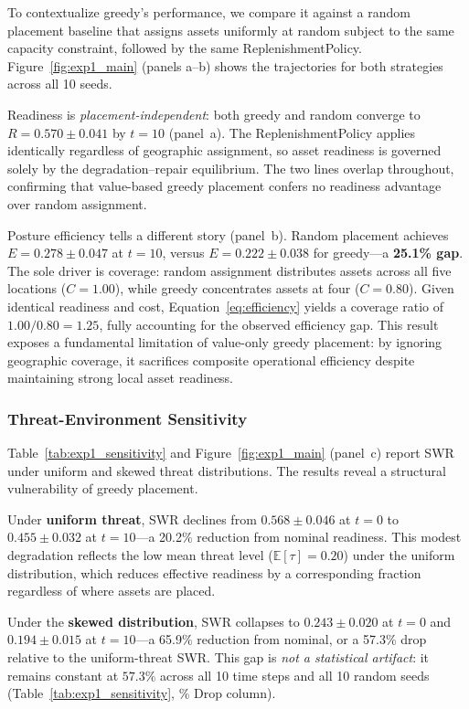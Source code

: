 \documentclass[11pt]{article}
\begin{document}
To contextualize greedy's performance, we compare it against a random
placement baseline that assigns assets uniformly at random subject to the
same capacity constraint, followed by the same ReplenishmentPolicy.
Figure~\ref{fig:exp1_main} (panels a--b) shows the trajectories for both
strategies across all 10 seeds.

Readiness is \emph{placement-independent}: both greedy and random converge
to $R = 0.570 \pm 0.041$ by $t = 10$ (panel~a). The ReplenishmentPolicy
applies identically regardless of geographic assignment, so asset readiness
is governed solely by the degradation--repair equilibrium. The two lines
overlap throughout, confirming that value-based greedy placement confers
no readiness advantage over random assignment.

Posture efficiency tells a different story (panel~b). Random placement
achieves $E = 0.278 \pm 0.047$ at $t = 10$, versus $E = 0.222 \pm 0.038$
for greedy---a \textbf{25.1\% gap}. The sole driver is coverage: random
assignment distributes assets across all five locations ($C = 1.00$),
while greedy concentrates assets at four ($C = 0.80$). Given identical
readiness and cost, Equation~\eqref{eq:efficiency} yields a coverage
ratio of $1.00 / 0.80 = 1.25$, fully accounting for the observed
efficiency gap. This result exposes a fundamental limitation of value-only
greedy placement: by ignoring geographic coverage, it sacrifices composite
operational efficiency despite maintaining strong local asset readiness.

\subsubsection{Threat-Environment Sensitivity}

Table~\ref{tab:exp1_sensitivity} and Figure~\ref{fig:exp1_main} (panel~c)
report SWR under uniform and skewed threat distributions. The results
reveal a structural vulnerability of greedy placement.

Under \textbf{uniform threat}, SWR declines from $0.568 \pm 0.046$ at
$t = 0$ to $0.455 \pm 0.032$ at $t = 10$---a 20.2\% reduction from
nominal readiness. This modest degradation reflects the low mean threat
level ($\mathbb{E}[\tau] = 0.20$) under the uniform distribution, which
reduces effective readiness by a corresponding fraction regardless of
where assets are placed.

Under the \textbf{skewed distribution}, SWR collapses to
$0.243 \pm 0.020$ at $t = 0$ and $0.194 \pm 0.015$ at $t = 10$---a
65.9\% reduction from nominal, or a 57.3\% drop relative to the
uniform-threat SWR. This gap is \emph{not a statistical artifact}: it
remains constant at $57.3\%$ across all 10 time steps and all 10 random
seeds (Table~\ref{tab:exp1_sensitivity}, \% Drop column).
\end{document}
